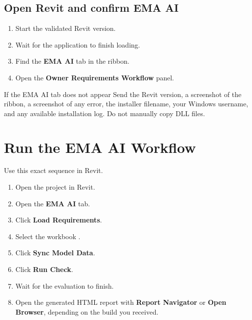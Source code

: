 \clearpage
\subsection*{Open Revit and confirm EMA AI}
\begin{enumerate}
  \item Start the validated Revit version.
  \item Wait for the application to finish loading.
  \item Find the \textbf{EMA AI} tab in the ribbon.
  \item Open the \textbf{Owner Requirements Workflow} panel.
\end{enumerate}

\begin{center}
\end{center}

\begin{warnbox}{If the EMA AI tab does not appear}
Send the Revit version, a screenshot of the ribbon, a screenshot of any error, the installer filename, your Windows username, and any available installation log. Do not manually copy DLL files.
\end{warnbox}
\clearpage

\section{Run the EMA AI Workflow}
Use this exact sequence in Revit.
\begin{enumerate}
  \item Open the project in Revit.
  \item Open the \textbf{EMA AI} tab.
  \item Click \textbf{Load Requirements}.
  \item Select the workbook .
  \item Click \textbf{Sync Model Data}.
  \item Click \textbf{Run Check}.
  \item Wait for the evaluation to finish.
  \item Open the generated HTML report with \textbf{Report Navigator} or \textbf{Open Browser}, depending on the build you received.
\end{enumerate}


